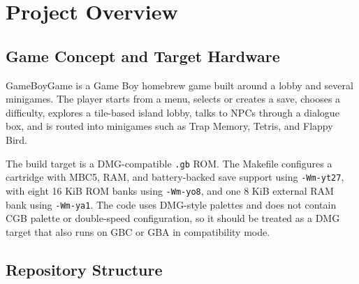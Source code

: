 \chapter{Project Overview}

\section{Game Concept and Target Hardware}

GameBoyGame is a Game Boy homebrew game built around a lobby and several minigames. The player starts from a menu, selects or creates a save, chooses a difficulty, explores a tile-based island lobby, talks to NPCs through a dialogue box, and is routed into minigames such as Trap Memory, Tetris, and Flappy Bird.

The build target is a DMG-compatible \texttt{.gb} ROM. The Makefile configures a cartridge with MBC5, RAM, and battery-backed save support using \texttt{-Wm-yt27}, with eight 16 KiB ROM banks using \texttt{-Wm-yo8}, and one 8 KiB external RAM bank using \texttt{-Wm-ya1}. The code uses DMG-style palettes and does not contain CGB palette or double-speed configuration, so it should be treated as a DMG target that also runs on GBC or GBA in compatibility mode.

\section{Repository Structure}

